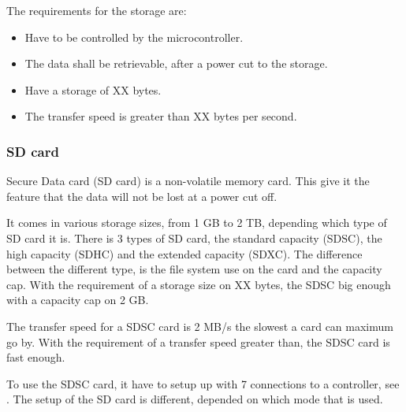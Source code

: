 The requirements for the storage are:
\begin{itemize}
\item Have to be controlled by the microcontroller.
\item The data shall be retrievable, after a power cut to the storage. 
\item Have a storage of XX bytes. 
\item The transfer speed is greater than XX bytes per second. 
\end{itemize}

\subsubsection{SD card} \label{SDcard}
Secure Data card (SD card) is a non-volatile memory card. This give it the feature that the data will not be lost at a power cut off. 

It comes in various storage sizes, from 1 GB to 2 TB, depending which type of SD card it is. There is 3 types of SD card, the standard capacity (SDSC), the high capacity (SDHC) and the extended capacity (SDXC). The  difference between the different type, is the file system use on the card and the capacity cap. With the requirement of a storage size on XX bytes, the SDSC big enough with a capacity cap on 2 GB. 

The transfer speed for a SDSC card is 2 MB/s the slowest a card can maximum go by. With the requirement of a transfer speed greater than, the SDSC card is fast enough. 

To use the SDSC card, it have to setup up with 7 connections to a controller, see . The setup of the SD card is different, depended on which mode that is used. 

